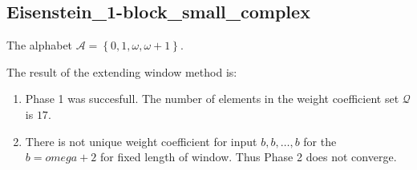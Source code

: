 \subsection{ Eisenstein\_1-block\_small\_complex }

\label{subsec:Eisenstein1-blocksmallcomplex}

The alphabet $\mathcal{A} =\left\{0, 1, \omega, \omega + 1\right\}$.

\noindent The result of the extending window method is:
\begin{enumerate}
    \item Phase 1 was succesfull.
The number of elements in the weight coefficient set $\mathcal{Q}$ is $17$.

    \item There is not unique weight coefficient for input $b,b,\dots,b$ for the $b= omega + 2 $ for fixed length of window. Thus Phase 2 does not converge.

\end{enumerate}
